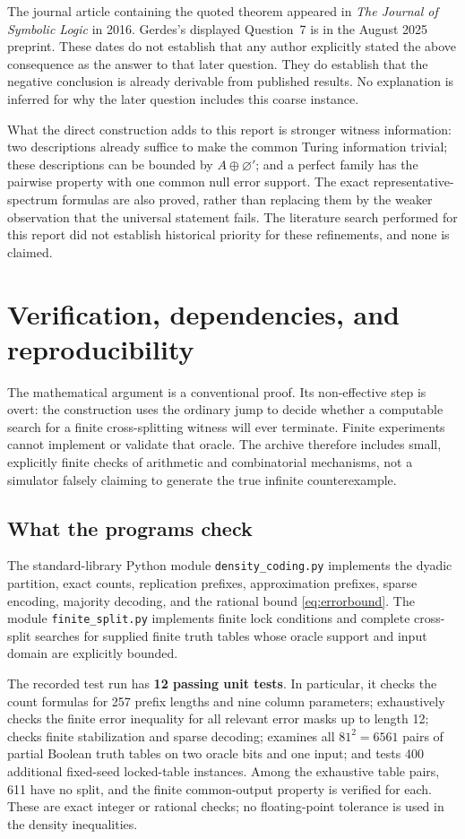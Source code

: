 \documentclass[11pt,a4paper]{article}
\newcommand{\code}[1]{\texttt{#1}}
\theoremstyle{definition}\newtheorem{definition}[theorem]{Definition}
\theoremstyle{remark}\newtheorem{remark}[theorem]{Remark}
\begin{document}
The journal article containing the quoted theorem appeared in \emph{The Journal of Symbolic Logic} in 2016.\cite{HJKS} Gerdes's displayed Question~7 is in the August 2025 preprint.\cite{Gerdes} These dates do not establish that any author explicitly stated the above consequence as the answer to that later question. They do establish that the negative conclusion is already derivable from published results. No explanation is inferred for why the later question includes this coarse instance.

What the direct construction adds to this report is stronger witness information: two descriptions already suffice to make the common Turing information trivial; these descriptions can be bounded by $A\oplus\varnothing'$; and a perfect family has the pairwise property with one common null error support. The exact representative-spectrum formulas are also proved, rather than replacing them by the weaker observation that the universal statement fails. The literature search performed for this report did not establish historical priority for these refinements, and none is claimed.

\section{Verification, dependencies, and reproducibility}
\label{sec:verification}
The mathematical argument is a conventional proof. Its non-effective step is overt: the construction uses the ordinary jump to decide whether a computable search for a finite cross-splitting witness will ever terminate. Finite experiments cannot implement or validate that oracle. The archive therefore includes small, explicitly finite checks of arithmetic and combinatorial mechanisms, not a simulator falsely claiming to generate the true infinite counterexample.

\subsection{What the programs check}
The standard-library Python module \code{density\_coding.py} implements the dyadic partition, exact counts, replication prefixes, approximation prefixes, sparse encoding, majority decoding, and the rational bound \eqref{eq:errorbound}. The module \code{finite\_split.py} implements finite lock conditions and complete cross-split searches for supplied finite truth tables whose oracle support and input domain are explicitly bounded.

The recorded test run has \textbf{12 passing unit tests}. In particular, it checks the count formulas for 257 prefix lengths and nine column parameters; exhaustively checks the finite error inequality for all relevant error masks up to length 12; checks finite stabilization and sparse decoding; examines all $81^2=6561$ pairs of partial Boolean truth tables on two oracle bits and one input; and tests 400 additional fixed-seed locked-table instances. Among the exhaustive table pairs, 611 have no split, and the finite common-output property is verified for each. These are exact integer or rational checks; no floating-point tolerance is used in the density inequalities.
\end{document}
